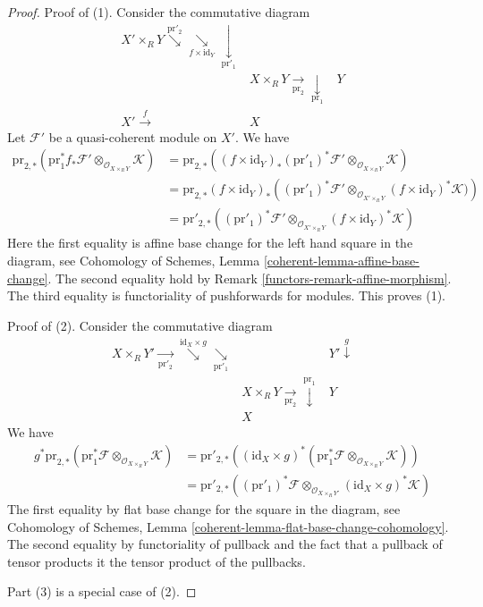 \begin{proof}

Proof of (1). Consider the commutative diagram
$$
\begin{array}{ccc}X' \times_R Y \overset{\text{pr}'_2}{\searrow}\underset{f \times \text{id}_Y}{\searrow}\underset{\text{pr}'_1}{\downarrow} &  &  \\  & X \times_R Y \underset{\text{pr}_2}{\longrightarrow}\underset{\text{pr}_1}{\downarrow} & Y \\ X' \overset{f}{\longrightarrow} & X & \end{array}
$$
Let $\mathcal{F}'$ be a quasi-coherent module on $X'$. We have
\begin{align*}
\text{pr}_{2, *}(\text{pr}_1^*f_*\mathcal{F}'
\otimes_{\mathcal{O}_{X \times_R Y}} \mathcal{K})
& =
\text{pr}_{2, *}((f \times \text{id}_Y)_*
(\text{pr}'_1)^*\mathcal{F}'
\otimes_{\mathcal{O}_{X \times_R Y}} \mathcal{K}) \\
& =
\text{pr}_{2, *}(f \times \text{id}_Y)_*
\left((\text{pr}'_1)^*\mathcal{F}'
\otimes_{\mathcal{O}_{X' \times_R Y}}
(f \times \text{id}_Y)^*\mathcal{K})\right)  \\
& =
\text{pr}'_{2, *}((\text{pr}'_1)^*\mathcal{F}'
\otimes_{\mathcal{O}_{X' \times_R Y}} (f \times \text{id}_Y)^*\mathcal{K})
\end{align*}
Here the first equality is affine base change for the left hand
square in the diagram, see
Cohomology of Schemes, Lemma \ref{coherent-lemma-affine-base-change}.
The second equality hold by Remark \ref{functors-remark-affine-morphism}.
The third equality is functoriality of pushforwards for modules.
This proves (1).

\medskip\noindent
Proof of (2). Consider the commutative diagram
$$
\begin{array}{ccc}X \times_R Y' \underset{\text{pr}'_2}{\longrightarrow}\overset{\text{id}_X \times g}{\searrow}\underset{\text{pr}'_1}{\searrow} &  & Y' \overset{g}{\downarrow} \\  & X \times_R Y \underset{\text{pr}_2}{\longrightarrow}\overset{\text{pr}_1}{\downarrow} & Y \\  & X & \end{array}
$$
We have
\begin{align*}
g^*\text{pr}_{2, *}(\text{pr}_1^*\mathcal{F}
\otimes_{\mathcal{O}_{X \times_R Y}} \mathcal{K})
& =
\text{pr}'_{2, *}(
(\text{id}_X \times g)^*(
\text{pr}_1^*\mathcal{F} \otimes_{\mathcal{O}_{X \times_R Y}} \mathcal{K})) \\
& =
\text{pr}'_{2, *}((\text{pr}'_1)^*\mathcal{F}
\otimes_{\mathcal{O}_{X \times_R Y'}}
(\text{id}_X \times g)^*\mathcal{K})
\end{align*}
The first equality by flat base change for the square in the diagram, see
Cohomology of Schemes, Lemma \ref{coherent-lemma-flat-base-change-cohomology}.
The second equality by functoriality of pullback and the fact that
a pullback of tensor products it the tensor product of the pullbacks.

\medskip\noindent
Part (3) is a special case of (2).
\end{proof}

